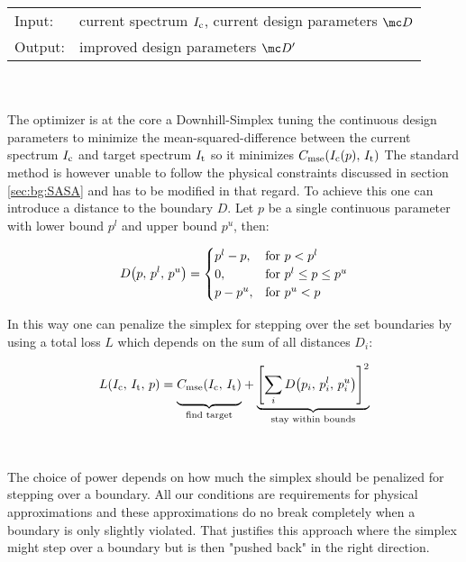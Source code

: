 \begin{tabular}{ll}
    \toprule
    Input: &
    current spectrum $I_{\mathrm{c}}$, 
    current design parameters $\mc D$\\
    Output: & 
    improved design parameters $\mc D'$\\
    \bottomrule
\end{tabular}
\\
\\
The optimizer is at the core a Downhill-Simplex \cite{Nelder1965} tuning the continuous design parameters to minimize the mean-squared-difference between the current spectrum $I_{\mathrm{c}}$ and target spectrum $I_{\mathrm{t}}$ so it minimizes
$C_{\mathrm{mse}}\qty(I_{\mathrm{c}}(p), \, I_{\mathrm{t}})$
The standard method is however unable to follow the physical constraints discussed in section \ref{sec:bg:SASA} and has to be modified in that regard. To achieve this one can introduce a distance to the boundary $D$. Let $p$ be a single continuous parameter with lower bound $p^l$ and upper bound $p^u$, then:

\begin{equation}
    D\qty(p, \, p^l, \, p^u) =
    \begin{cases}
        p^l - p, & \text{for } p < p^l\\
        0, & \text{for } p^l \leq p \leq p^u\\
        p - p^u, & \text{for } p^u < p
    \end{cases}
\end{equation}

\noindent
In this way one can penalize the simplex for stepping over the set boundaries by using a total loss $L$ which depends on the sum of all distances $D_i$:

\begin{equation}
    L(I_\s{c}, \,I_\s{t}, \,p) =
    {\underbrace{%
    \vphantom{ \left(\frac{a^{0.3}}{b}\right) }
    C_\s{mse}(I_\s{c}, \, I_\s{t})}_{\text{find target}}}
    +
    {\underbrace{%
    \qty[\sum_i D\qty(p_i, \, p_i^l, \, p_i^u)]^2
    }_{\text{stay within bounds}}}\\
\end{equation}
\\
\\
\noindent
The choice of power depends on how much the simplex should be penalized for stepping over a boundary. All our conditions are requirements for physical approximations and these approximations do no break completely when a boundary is only slightly violated. That justifies this approach where the simplex might step over a boundary but is then "pushed back" in the right direction.